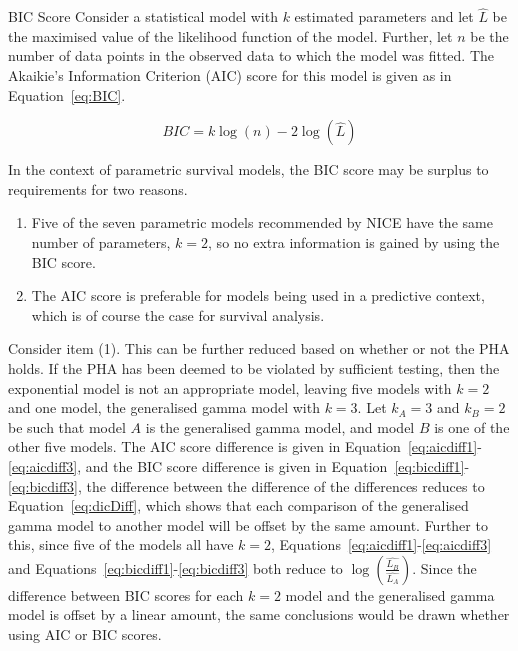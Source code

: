 \begin{definition}[label=def:BIC]{BIC Score}
    Consider a statistical model with $k$ estimated parameters and let $\hat{L}$ be the maximised value of the likelihood function of the model. Further, let $n$ be the number of data points in the observed data to which the model was fitted. The Akaikie's Information Criterion (AIC) score for this model is given as in Equation~\ref{eq:BIC}.

    \begin{equation}
        BIC =  k\log(n) - 2\log(\hat{L})
        \label{eq:BIC}
    \end{equation}
\end{definition}

In the context of parametric survival models, the BIC score may be surplus to requirements for two reasons.

\begin{enumerate}
    \item Five of the seven parametric models recommended by NICE have the same number of parameters, $k = 2$, so no extra information is gained by using the BIC score. \\
    \item The AIC score is preferable for models being used in a predictive context, which is of course the case for survival analysis.
\end{enumerate}

Consider item (1). This can be further reduced based on whether or not the PHA holds. If the PHA has been deemed to be violated by sufficient testing, then the exponential model is not an appropriate model, leaving five models with $k = 2$ and one model, the generalised gamma model with $k = 3$. Let $k_A = 3$ and $k_B = 2$ be such that model $A$ is the generalised gamma model, and model $B$ is one of the other five models. The AIC score difference is given in Equation~\ref{eq:aicdiff1}-\ref{eq:aicdiff3}, and the BIC score difference is given in Equation~\ref{eq:bicdiff1}-\ref{eq:bicdiff3}, the difference between the difference of the differences reduces to  Equation~\ref{eq:dicDiff}, which shows that each comparison of the generalised gamma model to another model will be offset by the same amount. Further to this, since five of the models all have $k = 2$, Equations~\ref{eq:aicdiff1}-\ref{eq:aicdiff3} and Equations~\ref{eq:bicdiff1}-\ref{eq:bicdiff3} both reduce to $\log\left(\frac{\hat{L_B}}{\hat{L_A}}\right)$. Since the difference between BIC scores for each $k = 2$ model and the generalised gamma model is offset by a linear amount, the same conclusions would be drawn whether using AIC or BIC scores. \\

